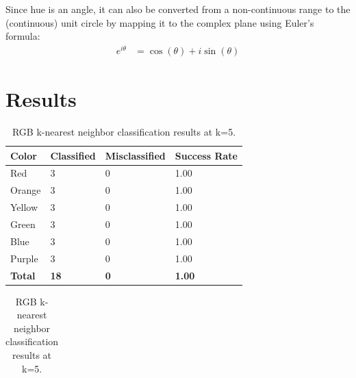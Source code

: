 \documentclass[twoside]{IEEEtran}
\begin{document}
Since hue is an angle, it can also be converted from a non-continuous range to the (continuous)
unit circle by mapping it to the complex plane using Euler's formula:
\begin{align*}
    e^{i\theta} & = \cos\left(\theta\right) + i \sin\left(\theta\right)
\end{align*}

\section{Results}

\begin{table}[!b]
    \centering

    \begin{minipage}{\columnwidth}
        \centering
        \caption{RGB k-nearest neighbor classification results at k=3.}%
        \label{rgb_knn_3}
        \begin{tabular}{ l l l l }
            \toprule
            \bfseries Color & \bfseries Classified & \bfseries Misclassified & \bfseries Success Rate \\
            \midrule
            Red             & 3                    & 0                       & 1.00                   \\
            Orange          & 3                    & 0                       & 1.00                   \\
            Yellow          & 3                    & 0                       & 1.00                   \\
            Green           & 3                    & 0                       & 1.00                   \\
            Blue            & 3                    & 0                       & 1.00                   \\
            Purple          & 3                    & 0                       & 1.00                   \\
            \midrule
            \bfseries Total & \bfseries 18         & \bfseries 0             & \bfseries 1.00         \\
            \bottomrule
        \end{tabular}
    \end{minipage}%
    \begin{minipage}{\columnwidth}
        \centering
        \caption{RGB k-nearest neighbor classification results at k=5.}%
        \label{rgb_knn_5}
        \begin{tabular}{ l l l l }

\end{tabular}
\end{minipage}
\end{table}
\end{document}
